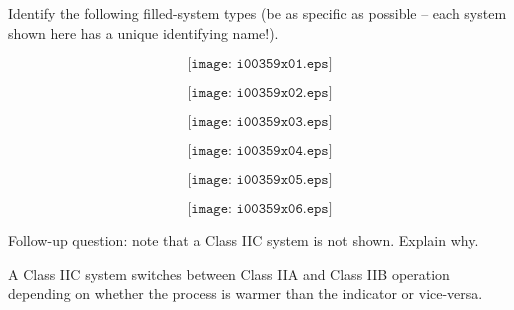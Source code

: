 

Identify the following filled-system types (be as specific as possible -- each system shown here has a unique identifying name!).

$$\texttt{[image: i00359x01.eps]}$$

$$\texttt{[image: i00359x02.eps]}$$

$$\texttt{[image: i00359x03.eps]}$$







$$\texttt{[image: i00359x04.eps]}$$

$$\texttt{[image: i00359x05.eps]}$$

$$\texttt{[image: i00359x06.eps]}$$

\vskip 10pt

Follow-up question: note that a Class IIC system is not shown.  Explain why.







A Class IIC system switches between Class IIA and Class IIB operation depending on whether the process is warmer than the indicator or vice-versa.




